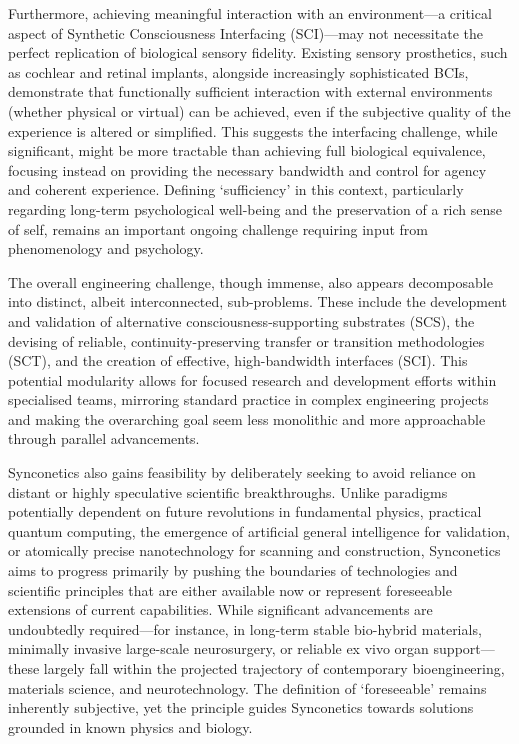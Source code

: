 \documentclass[10pt]{article}
\begin{document}
\begin{sloppypar}
  Furthermore, achieving meaningful interaction with an environment—a critical aspect of Synthetic Consciousness Interfacing (SCI)—may not necessitate the perfect replication of biological sensory fidelity. Existing sensory prosthetics, such as cochlear and retinal implants, alongside increasingly sophisticated BCIs, demonstrate that functionally sufficient interaction with external environments (whether physical or virtual) can be achieved, even if the subjective quality of the experience is altered or simplified. This suggests the interfacing challenge, while significant, might be more tractable than achieving full biological equivalence, focusing instead on providing the necessary bandwidth and control for agency and coherent experience. Defining ‘sufficiency’ in this context, particularly regarding long-term psychological well-being and the preservation of a rich sense of self, remains an important ongoing challenge requiring input from phenomenology and psychology.

  The overall engineering challenge, though immense, also appears decomposable into distinct, albeit interconnected, sub-problems. These include the development and validation of alternative consciousness-supporting substrates (SCS), the devising of reliable, continuity-preserving transfer or transition methodologies (SCT), and the creation of effective, high-bandwidth interfaces (SCI). This potential modularity allows for focused research and development efforts within specialised teams, mirroring standard practice in complex engineering projects and making the overarching goal seem less monolithic and more approachable through parallel advancements.

  Synconetics also gains feasibility by deliberately seeking to avoid reliance on distant or highly speculative scientific breakthroughs. Unlike paradigms potentially dependent on future revolutions in fundamental physics, practical quantum computing, the emergence of artificial general intelligence for validation, or atomically precise nanotechnology for scanning and construction, Synconetics aims to progress primarily by pushing the boundaries of technologies and scientific principles that are either available now or represent foreseeable extensions of current capabilities. While significant advancements are undoubtedly required—for instance, in long-term stable bio-hybrid materials, minimally invasive large-scale neurosurgery, or reliable ex vivo organ support—these largely fall within the projected trajectory of contemporary bioengineering, materials science, and neurotechnology. The definition of ‘foreseeable’ remains inherently subjective, yet the principle guides Synconetics towards solutions grounded in known physics and biology.


\end{sloppypar}
\end{document}
